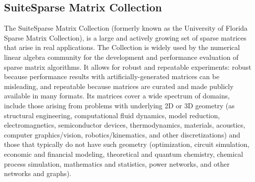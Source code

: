 \subsection{SuiteSparse Matrix Collection}
The SuiteSparse Matrix Collection (formerly known as the University of Florida 
Sparse Matrix Collection), is a large and actively growing set of sparse 
matrices that arise in real applications. The Collection is widely used by the 
numerical linear algebra community for the development and performance 
evaluation of sparse matrix algorithms. It allows for robust and repeatable 
experiments: robust because performance results with artificially-generated 
matrices can be misleading, and repeatable because matrices are curated and made 
publicly available in many formats. Its matrices cover a wide spectrum of 
domains, include those arising from problems with underlying 2D or 3D geometry 
(as structural engineering, computational fluid dynamics, model reduction, 
electromagnetics, semiconductor devices, thermodynamics, materials, acoustics, 
computer graphics/vision, robotics/kinematics, and other discretizations) and 
those that typically do not have such geometry (optimization, circuit 
simulation, economic and financial modeling, theoretical and quantum chemistry, 
chemical process simulation, mathematics and statistics, power networks, and 
other networks and graphs). 

